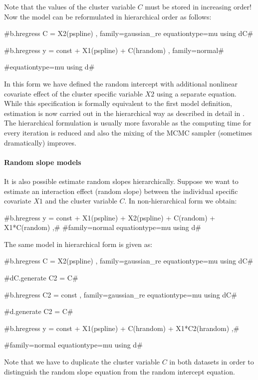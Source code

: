 Note that the values of the cluster variable $C$ must be stored in increasing order! Now the model can be reformulated in hierarchical order as
follows:

#b.hregress C = X2(pspline) , family=gaussian_re equationtype=mu using dC#

#b.hregress y = const + X1(pspline)  + C(hrandom) , family=normal#

#equationtype=mu using d#

In this form we have defined the random intercept with additional nonlinear covariate effect of the cluster specific
variable $X2$ using a separate equation. While this specification is formally equivalent to the first
model definition, estimation is now carried out in the hierarchical way as described in detail in . The hierarchical
formulation is usually more favorable as the computing time for every iteration is reduced and also the mixing of the MCMC sampler (sometimes
dramatically) improves.

\paragraph{Random slope models}

$ $ \\

It is also possible estimate random slopes hierarchically. Suppose we want to estimate an interaction effect (random slope) between the individual specific covariate $X1$ and the cluster variable $C$. In non-hierarchical form we obtain:

#b.hregress y = const + X1(pspline)  + X2(pspline) + C(random) + X1*C(random) ,#
#family=normal equationtype=mu using d#

The same model in hierarchical form is given as:

#b.hregress C = X2(pspline) , family=gaussian_re equationtype=mu using dC#

#dC.generate C2 = C#

#b.hregress C2 = const , family=gaussian_re equationtype=mu using dC#

#d.generate C2 = C#

#b.hregress y = const + X1(pspline)  + C(hrandom) + X1*C2(hrandom) ,#

#family=normal equationtype=mu using d#

Note that we have to duplicate the cluster variable $C$ in both datasets in order to distinguish the random slope equation
from the random intercept equation.


